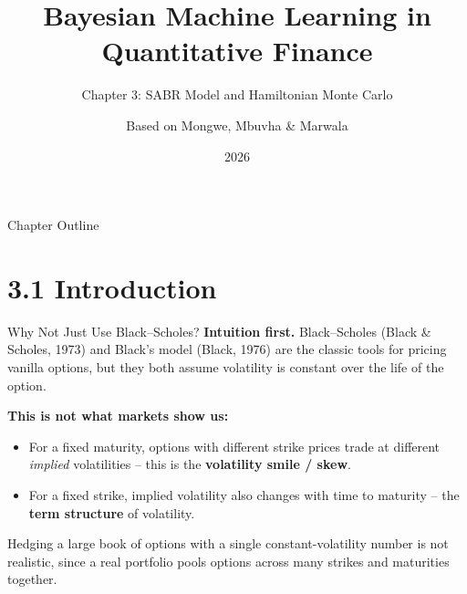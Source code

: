 \documentclass[aspectratio=169,10pt]{beamer}
\title[Bayesian ML in QF -- Ch.3]{Bayesian Machine Learning in Quantitative Finance}
\subtitle{Chapter 3: SABR Model and Hamiltonian Monte Carlo}
\author{Based on Mongwe, Mbuvha \& Marwala}
\institute{Adapted for Lecture Slides}
\date{2026}
\begin{document}

\begin{frame}
  \titlepage
\end{frame}

\begin{frame}{Chapter Outline}
  \tableofcontents
\end{frame}

\section{3.1 Introduction}

\begin{frame}{Why Not Just Use Black--Scholes?}
  \textbf{Intuition first.} Black--Scholes (Black \& Scholes, 1973) and Black's
  model (Black, 1976) are the classic tools for pricing vanilla options, but
  they both assume \alert{volatility is constant} over the life of the option.

  \vspace{2mm}
  \textbf{This is not what markets show us:}
  \begin{itemize}
    \item For a fixed maturity, options with different strike prices trade at
      different \emph{implied} volatilities -- this is the \textbf{volatility
      smile / skew}.
    \item For a fixed strike, implied volatility also changes with time to
      maturity -- the \textbf{term structure} of volatility.
  \end{itemize}

  \vspace{2mm}
  Hedging a large book of options with a single constant-volatility number is
  not realistic, since a real portfolio pools options across many strikes and
  maturities together.
\end{frame}
\end{document}
